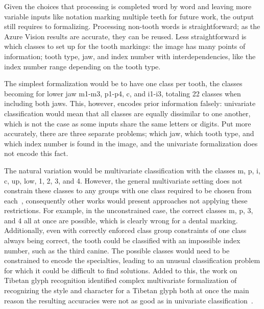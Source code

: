 \documentclass[english,twoside,openright]{UH_DS_MSc}
\begin{document}
Given the choices that processing is completed word by word and leaving more variable inputs like 
notation marking multiple teeth for future work, the output still requires to formalizing.
Processing non-tooth words is straightforward; as the Azure Vision results are accurate, they
can be reused. Less straightforward is which classes to set up for the 
tooth markings: the image has many points of information; tooth type, jaw, and index number with 
interdependencies, like the index number range depending on the tooth type.

The simplest formalization would be to have one class per tooth, the classes becoming for lower jaw m1-m3, p1-p4, c, and i1-i3,
totaling 22 classes when including both jaws. This, however, encodes prior information falsely: univariate classification would 
mean that all classes are equally dissimilar to one another, which is not the case as some inputs share the same letters or digits.
Put more accurately, there are three separate problems; which jaw, which tooth type, and which index number is found in the image, 
and the univariate formalization does not encode this fact.

The natural variation would be multivariate classification with the classes m, p, i, c, up, low, 1, 2, 3, and 4. However, 
the general multivariate setting does not constrain these classes to any groups with one class required to be chosen from 
each~\cite{multilabel_classification}, consequently other works would present approaches not applying these restrictions.
For example, in the unconstrained case, the correct classes m, p, 3, and 4 all at 
once are possible, which is clearly wrong for a dental marking. Additionally, even with correctly enforced class group constraints of one class always being correct, the tooth could be classified with an impossible index number, such as the third canine.
The possible classes would need to be constrained to encode the specialties, leading to an unusual classification problem for which it could be difficult to 
find solutions. Added to this, the work on Tibetan glyph recognition identified complex multivariate formalization of 
recognizing the style and character for a Tibetan glyph both at once the main reason the resulting 
accuracies were not as good as in univariate classification~\cite{4zhaoTibetan}.
\end{document}
